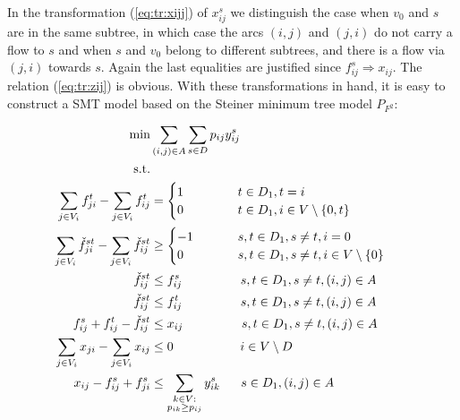 In the transformation (\ref{eq:tr:xijj}) of $x_{ij}^s$ we distinguish the case when $v_0$ and $s$ are in the same subtree, in which case the arcs $(i,j)$ and $(j,i)$ do not carry a flow to $s$ and when $s$ and $v_0$ belong to different subtrees, and there is a flow via $(j,i)$ towards $s$. Again the last equalities are justified since $f_{ij}^s\Rightarrow x_{ij}$. The relation (\ref{eq:tr:zij}) is obvious.
With these transformations in hand, it is easy to construct a SMT model based on the Steiner minimum tree model $P_{F^2}$:

    \begin{subequations}
    \begin{flalign}
  \min &  \sum\limits_{(i,j) \in A} \sum\limits_{s \in D} p_{ij} y^s_{ij}    \\  \notag  
		   \text{s.t.}&                  && \\	\ 
 \label{con:pf2:flow}  \sum\limits_{\substack{ j \in V_i }}f^{t}_{ji}-\sum\limits_{\substack{j\in V_i}}f^{t}_{ij}    & = \begin{cases}
    1~~~~&  t\in D_1, t = i \\        0~~~~ \qquad             & t\in D_1, i\in V\setminus \{0, t\}\end{cases}     \\	
\label{con:pf2:flowSource}  \sum\limits_{\substack{ j \in V_i }}\check{f}^{st}_{ji}-\sum\limits_{\substack{j\in V_i}}\check{f}^{st}_{ij}    & \geq \begin{cases}
    -1~~~&  s,t\in D_1,s\neq t, i = 0 \\        0  ~~~~   \qquad         & s,t\in D_1,s\neq t, i\in V\setminus \{0\}\end{cases}     \\			
\label{con:pf2:startInSource}  \check{f}^{st}_{ij}    & \leq f^s_{ij}~~   \qquad  \qquad s,t\in D_1,s\neq t, (i,j)\in A \\	
\label{con:pf2:stopInDest}  \check{f}^{st}_{ij}    & \leq f^t_{ij}~~   \qquad    \qquad s,t\in D_1,s\neq t, (i,j)\in A \\			 		
 \label{con:pf2:stronger}  f^{s}_{ij}+f^{t}_{ij}-\check{f}^{st}_{ij}    &\leq x_{ij}    ~~ \qquad \qquad  s,t\in D_1,s\neq t, (i,j)\in A \\			 
		 	 \label{con:pf2:flowX}  \sum\limits_{\substack{ j\in V_i }}x_{ji}-\sum\limits_{\substack{j\in V_i}}x_{ij}    & \leq 0~~~~    \qquad\qquad			  i\in V\setminus D \\			 			   	
		  \label{con:pf2:yvar} x_{ij} -f^s_{ij}+f^s_{ji}  &\leq \sum\limits_{\substack{k\in V: \\ p_{ik}\geq p_{ij}}}y^s_{ik}   ~~\quad  s\in D_1, (i,j)\in A \\  		

\end{flalign}
\end{subequations}
